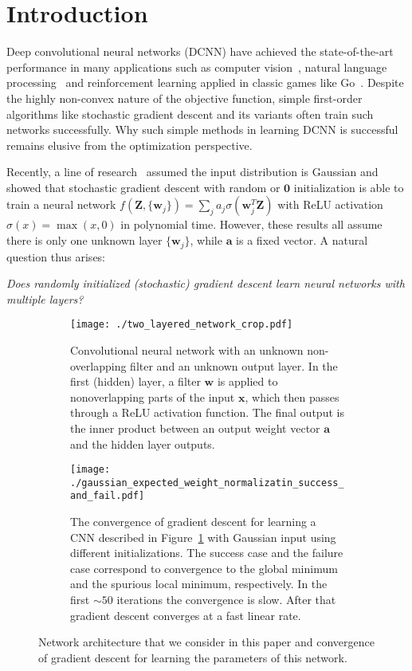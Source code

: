 \documentclass{article}
\newcommand{\firstlayer}{w}
\newcommand{\secondlayer}{a}
\def\vw{\mathbf{w}}
\def\va{\mathbf{a}}
\def\vZ{\mathbf{Z}}
\newcommand{\mat}[1]{\mathbf{#1}}
\newcommand{\vect}[1]{\mathbf{#1}}
\begin{document}
\section{Introduction}
\label{sec:intro}
Deep convolutional neural networks (DCNN) have achieved the state-of-the-art performance in many applications such as computer vision~\citep{krizhevsky2012imagenet}, natural language processing~\citep{dauphin2016language} and reinforcement learning applied in classic games like Go~\citep{silver2016mastering}.
Despite the highly non-convex nature of the objective function, simple first-order algorithms like stochastic gradient descent and its variants often train such networks successfully.
Why such simple methods in learning DCNN is successful remains elusive from the optimization perspective.


Recently, a line of research~\citep{tian2017analytical,brutzkus2017globally,li2017convergence,soltanolkotabi2017learning,shalev2017weight} assumed the input distribution is Gaussian and showed that stochastic gradient descent with random or $\vect{0}$ initialization is able to train a neural network $f(\mat{Z}, \{\vw_j\}) = \sum_j a_j\sigma(\vw_j^T\vZ)$ with ReLU activation $\sigma(x) = \max(x, 0)$ in polynomial time.
However, these results all assume there is only one unknown layer $\{\vw_j\}$, while $\va$ is a fixed vector. A natural question thus arises:
\begin{center}
\emph{Does randomly initialized (stochastic) gradient descent learn  neural networks with multiple layers?}
\end{center}\begin{figure*}
	\centering
	\begin{subfigure}[t]{0.45\textwidth}
		\texttt{[image: ./two\_layered\_network\_crop.pdf]}
		\caption{Convolutional neural network with an unknown non-overlapping filter and an unknown output layer.
	In the first (hidden) layer, a filter $\vect{\firstlayer}$ is applied to nonoverlapping parts of the input $\vect{x}$, which then passes through a ReLU activation function.
	The final output is the inner product between an output weight vector $\vect{\secondlayer}$ and the hidden layer outputs.
	}\label{fig:architecture}
	\end{subfigure}
	\qquad
	\begin{subfigure}[t]{0.45\textwidth}
	\texttt{[image: ./gaussian\_expected\_weight\_normalizatin\_success\_and\_fail.pdf]}
		\caption{The convergence of gradient descent for learning a CNN described in Figure~\ref{fig:architecture} with Gaussian input using different initializations.
The success case and the failure case correspond to convergence to the global minimum and the spurious local minimum, respectively.
In the first $\sim 50$ iterations the convergence is slow.
After that gradient descent converges at a fast linear rate.
			}\label{fig:gd_convergence}
	\end{subfigure}
	\caption{Network architecture that we consider in this paper and convergence of gradient descent for learning the parameters of this network.
}
    \label{fig:architecture_and_convergence}
\end{figure*}
\end{document}
